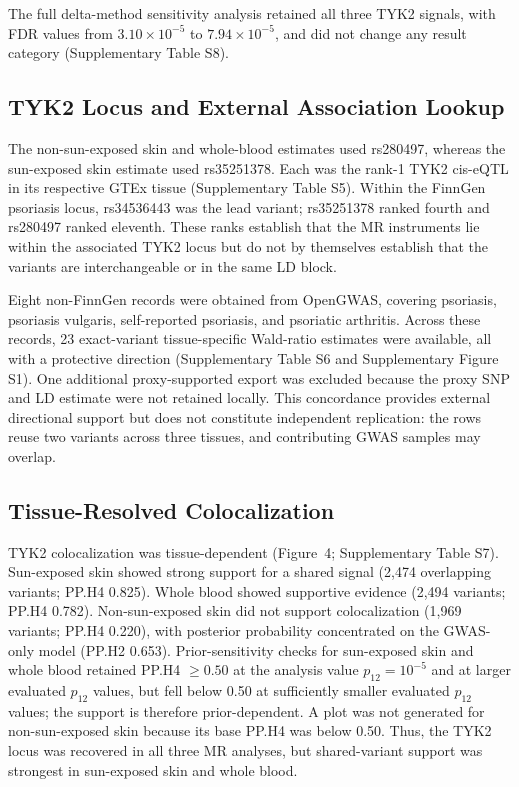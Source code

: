 The full delta-method sensitivity analysis retained all three TYK2 signals, with FDR values from $3.10\times10^{-5}$ to $7.94\times10^{-5}$, and did not change any result category (Supplementary Table S8).

\subsection*{TYK2 Locus and External Association Lookup}

The non-sun-exposed skin and whole-blood estimates used rs280497, whereas the sun-exposed skin estimate used rs35251378. Each was the rank-1 TYK2 cis-eQTL in its respective GTEx tissue (Supplementary Table S5). Within the FinnGen psoriasis locus, rs34536443 was the lead variant; rs35251378 ranked fourth and rs280497 ranked eleventh. These ranks establish that the MR instruments lie within the associated TYK2 locus but do not by themselves establish that the variants are interchangeable or in the same LD block.

Eight non-FinnGen records were obtained from OpenGWAS, covering psoriasis, psoriasis vulgaris, self-reported psoriasis, and psoriatic arthritis. Across these records, 23 exact-variant tissue-specific Wald-ratio estimates were available, all with a protective direction (Supplementary Table S6 and Supplementary Figure S1). One additional proxy-supported export was excluded because the proxy SNP and LD estimate were not retained locally. This concordance provides external directional support but does not constitute independent replication: the rows reuse two variants across three tissues, and contributing GWAS samples may overlap.

\subsection*{Tissue-Resolved Colocalization}

TYK2 colocalization was tissue-dependent (Figure~4; Supplementary Table S7). Sun-exposed skin showed strong support for a shared signal (2,474 overlapping variants; PP.H4 0.825). Whole blood showed supportive evidence (2,494 variants; PP.H4 0.782). Non-sun-exposed skin did not support colocalization (1,969 variants; PP.H4 0.220), with posterior probability concentrated on the GWAS-only model (PP.H2 0.653). Prior-sensitivity checks for sun-exposed skin and whole blood retained PP.H4 $\geq0.50$ at the analysis value $p_{12}=10^{-5}$ and at larger evaluated $p_{12}$ values, but fell below 0.50 at sufficiently smaller evaluated $p_{12}$ values; the support is therefore prior-dependent. A plot was not generated for non-sun-exposed skin because its base PP.H4 was below 0.50. Thus, the TYK2 locus was recovered in all three MR analyses, but shared-variant support was strongest in sun-exposed skin and whole blood.

